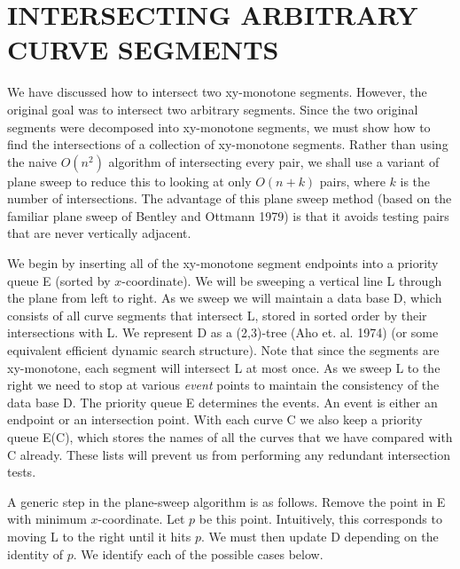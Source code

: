 \section{INTERSECTING ARBITRARY CURVE SEGMENTS}
\label{sec-sweep}

We have discussed how to intersect two xy-monotone segments.
However, the original goal was to intersect two arbitrary segments.
Since the two original segments were decomposed into xy-monotone segments, we must show
how to find the intersections of a collection of xy-monotone segments.
Rather than using the naive $O(n^{2})$ algorithm of intersecting every pair, 
we shall use a variant of plane sweep to reduce this to looking at only $O(n + k)$ pairs,
where $k$ is the number of intersections.
The advantage of this plane sweep method (based on the familiar plane sweep of Bentley 
and Ottmann 1979) is that it avoids testing pairs that are never vertically adjacent.

We begin by inserting all of the xy-monotone segment endpoints into a priority queue E
(sorted by $x$-coordinate).
We will be sweeping a vertical line L through the plane from left to right.
As we sweep we will maintain a data base D, which consists of all curve
segments that intersect L, stored in sorted order by their intersections with L.
We represent D as a (2,3)-tree (Aho et. al. 1974) (or some equivalent efficient dynamic
search structure).
Note that since the segments are xy-monotone, each segment will intersect L at most
once.  As we sweep L to the right we need to stop at various {\em event} points to 
maintain the consistency of the data base D.
The priority queue E determines the events.
An event is either an endpoint or an intersection point.
With each curve C we also keep a priority queue E(C), which stores the names of 
all the curves that we have compared with C already.
These lists will prevent us from performing any redundant intersection tests.

A generic step in the plane-sweep algorithm is as follows.
Remove the point in E with minimum $x$-coordinate.
Let $p$ be this point.
Intuitively, this corresponds to moving L to the right until it hits $p$.
We must then update D depending on the identity of $p$.
We identify each of the possible cases below.

